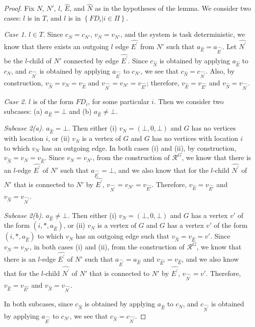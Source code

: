 \documentclass[11pt]{article}
\numberwithin{theorem}{section}
\newcommand{\set}[1]{\left\{#1\right\}}
\begin{document}
\begin{proof}
 Fix $N$, $N'$, $l$, $\hat{E}$, and $\hat{N}$ as in the hypotheses of the lemma. We consider two cases: $l$ is in $T$, and $l$ is in $\set{FD_i | i \in \Pi}$. 

 \emph{Case 1.} $l \in T$. Since $c_N = c_{N'}$, $v_N = v_{N'}$, and the system is task deterministic, we know that there exists an outgoing $l$ edge $\hat{E^\prime}$ from $N'$ such that $a_{\hat{E}} = a_{\hat{E^\prime}}$. Let $\hat{N^\prime}$ be the $l$-child of $N'$ connected by edge $\hat{E^\prime}$. Since $c_{\hat{N}}$ is obtained by applying $a_{\hat{E}}$ to $c_N$, and $c_{\hat{N^\prime}}$ is obtained by applying $a_{\hat{E^\prime}}$ to $c_{N'}$, we see that $c_{\hat{N}} = c_{\hat{N^\prime}}$. Also, by construction, $v_{\hat{N}} = v_N = v_{\hat{E}}$ and $v_{\hat{N^\prime}} = v_{N'} = v_{\hat{E'}}$; therefore, $v_{\hat{E}} = v_{\hat{E'}}$ and $v_{\hat{N}} = v_{\hat{N^\prime}}$.

 
 \emph{Case 2.} $l$ is of the form $FD_i$, for some particular $i$. Then we consider two subcases: (a) $a_{\hat{E}} = \bot$ and (b) $a_{\hat{E}} \neq \bot$.
 
 \emph{Subcase 2(a).} $a_{\hat{E}} = \bot$. Then either (i) $v_N = (\bot, 0, \bot)$ and $G$ has no vertices with location $i$, or (ii) $v_N$ is a vertex of $G$ and $G$ has no vertices with location $i$ to which $v_N$ has an outgoing edge. In both cases (i) and (ii), by construction, $v_{\hat{N}} = v_N = v_{\hat{E}}$. Since $v_N = v_{N'}$, from the construction of $\mathcal{R}^G$, we know that there is an $l$-edge $\hat{E^\prime}$ of $N'$ such that $a_{\hat{E^\prime}} = \bot$, and we also know that for the $l$-child $\hat{N^\prime}$ of $N'$ that is connected to $N'$ by $\hat{E^\prime}$, $v_{\hat{N^\prime}} = v_{N'} = v_{\hat{E'}}$. Therefore, $v_{\hat{E}} = v_{\hat{E'}}$ and $v_{\hat{N}} = v_{\hat{N^\prime}}$.

\emph{Subcase 2(b).} $a_{\hat{E}} \neq \bot$. Then either (i) $v_N = (\bot, 0, \bot)$ and $G$ has a vertex $v'$ of the form $(i,*,a_{\hat{E}})$, or (ii) $v_N$ is a vertex of $G$ and $G$ has a vertex $v'$ of the form $(i,*,a_{\hat{E}})$ to which $v_N$ has an outgoing edge such that $v_{\hat{N}} = v_{\hat{E}} = v'$. Since $v_N = v_{N'}$, in both cases (i) and (ii), from the construction of $\mathcal{R}^G$, we know that there is an $l$-edge $\hat{E^\prime}$ of $N'$ such that $a_{\hat{E^\prime}} = a_{\hat{E}}$ and $v_{\hat{E'}} = v_{\hat{E}}$, and we also know that for the $l$-child $\hat{N^\prime}$ of $N'$ that is connected to $N'$ by $\hat{E^\prime}$, $v_{\hat{N^\prime}} = v'$. Therefore, $v_{\hat{E}} = v_{\hat{E'}}$  and $v_{\hat{N}} = v_{\hat{N^\prime}}$.

In both subcases, since $c_{\hat{N}}$ is obtained by applying $a_{\hat{E}}$ to $c_N$, and $c_{\hat{N^\prime}}$ is obtained by applying $a_{\hat{E^\prime}}$ to $c_{N'}$, we see that $c_{\hat{N}} = c_{\hat{N^\prime}}$.  
 \end{proof}
 
\end{document}
